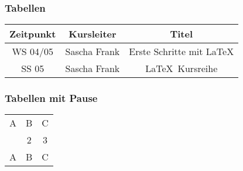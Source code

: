 \documentclass{beamer}
\begin{document}


\begin{frame}\frametitle{Tabellen}
\begin{tabular}{|c|c|c|}
\hline
\textbf{Zeitpunkt} & \textbf{Kursleiter} & \textbf{Titel} \\
\hline
WS 04/05 & Sascha Frank &  Erste Schritte mit \LaTeX  \\
\hline
SS 05 & Sascha Frank & \LaTeX \ Kursreihe \\
\hline
\end{tabular}
\end{frame}


\begin{frame}\frametitle{Tabellen mit Pause}
\begin{tabular}{c c c}
A & B & C \\ 
\pause 
1 & 2 & 3 \\  
\pause 
A & B & C \\ 
\end{tabular} 
\end{frame}
\end{document}
